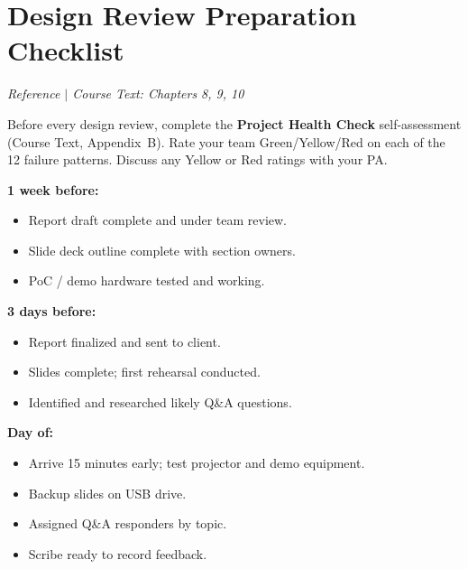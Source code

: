 \section{Design Review Preparation Checklist}
\textit{Reference $|$ Course Text: Chapters 8, 9, 10}

\begin{warnbox}
Before every design review, complete the \textbf{Project Health Check} self-assessment (Course Text, Appendix~B). Rate your team Green/Yellow/Red on each of the 12 failure patterns. Discuss any Yellow or Red ratings with your PA.
\end{warnbox}

\textbf{1 week before:}
\begin{itemize}[nosep,leftmargin=1.5em]
\item Report draft complete and under team review.
\item Slide deck outline complete with section owners.
\item PoC / demo hardware tested and working.
\end{itemize}

\textbf{3 days before:}
\begin{itemize}[nosep,leftmargin=1.5em]
\item Report finalized and sent to client.
\item Slides complete; first rehearsal conducted.
\item Identified and researched likely Q\&A questions.
\end{itemize}

\textbf{Day of:}
\begin{itemize}[nosep,leftmargin=1.5em]
\item Arrive 15 minutes early; test projector and demo equipment.
\item Backup slides on USB drive.
\item Assigned Q\&A responders by topic.
\item Scribe ready to record feedback.
\end{itemize}



